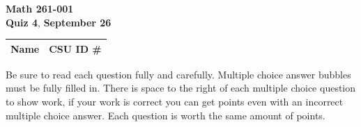 \documentclass[12pt]{exam}
\newcommand{\class}{Math 261-001} %
\newcommand{\examnum}{Quiz 4} %
\newcommand{\examdate}{September 26} %
\begin{document}
\pagestyle{plain}
\thispagestyle{empty}

\noindent
\textbf{\class}\\
\textbf{\examnum}, \textbf{\examdate} \\



\setlength{\tabcolsep}{3.5cm} %
\renewcommand{\arraystretch}{1.5}
\setlength\extrarowheight{1cm}
\begin{tabular}{ |c|c| } 
 \hline
 Name   & CSU ID \#  \\ 
 \hline
\end{tabular}
\vspace{10pt}

Be sure to read each question fully and carefully. Multiple choice answer bubbles must be fully filled in.  There is space to the right of each multiple choice question to show work, if your work is correct you can get points even with an incorrect multiple choice answer.  Each question is worth the same amount of points.

\end{document}
